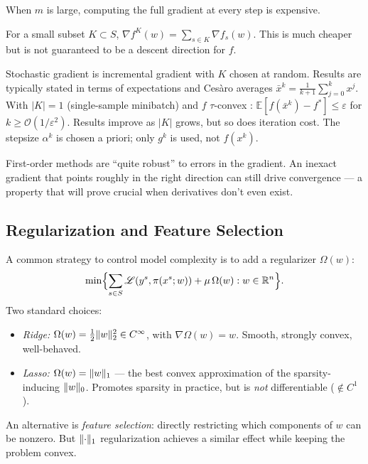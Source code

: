 When $m$ is large, computing the full gradient at every step is expensive.

\begin{defn}\label{def:incremental-grad}
	For a small subset $K \subset S$,
	$\nabla f^K(w) = \sum_{s \in K} \nabla f_s(w)$.
	This is much cheaper but is not guaranteed to be a descent direction for $f$.
\end{defn}

\begin{defn}\label{def:stochastic-grad}
	Stochastic gradient is incremental gradient with $K$ chosen at random.
	Results are typically stated in terms of expectations and Cesàro averages
	$\bar{x}^k = \frac{1}{k+1} \sum_{j=0}^{k} x^j$.
	With $|K| = 1$ (single-sample minibatch) and $f$ $\tau$-convex \cite{bubeck2015}:
	$\mathbb{E}[f(\bar{x}^k) - f^*] \leq \varepsilon$ for $k \geq \mathcal{O}(1/\varepsilon^2)$.
	Results improve as $|K|$ grows, but so does iteration cost.
	The stepsize $\alpha^k$ is chosen a priori; only $g^k$ is used, not $f(x^k)$.
\end{defn}

First-order methods are ``quite robust'' to errors in the gradient.
An inexact gradient that points roughly in the right direction can still drive convergence --- a property that will prove crucial when derivatives don't even exist.


\subsection{Regularization and Feature Selection}\label{ssec:regularization}

A common strategy to control model complexity is to add a regularizer $\Omega(w)$:
\begin{equation}\label{eq:regularized-problem}
	\min\Bigl\{\sum_{s \in S} \mathcal{L}(y^s, \pi(x^s; w)) + \mu\, \Omega(w) : w \in \mathbb{R}^n\Bigr\}.
\end{equation}
Two standard choices:
\begin{itemize}
	\item \textit{Ridge:} $\Omega(w) = \frac{1}{2}\lVert w\rVert_2^2 \in C^\infty$, with $\nabla\Omega(w) = w$.
		Smooth, strongly convex, well-behaved.
	\item \textit{Lasso:} $\Omega(w) = \lVert w\rVert_1$ --- the best convex approximation of the sparsity-inducing $\lVert w\rVert_0$.
		Promotes sparsity in practice, but is \emph{not} differentiable ($\notin C^1$).
\end{itemize}
An alternative is \textit{feature selection}: directly restricting which components of $w$ can be nonzero.
But $\lVert\cdot\rVert_1$ regularization achieves a similar effect while keeping the problem convex.


